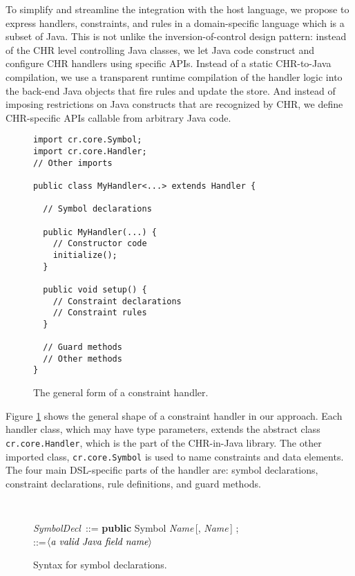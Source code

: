 \documentclass[runningheads,a4paper,11pt,dvipsname]{llncs}
\newcommand\angled[1]{\ensuremath{\left\langle#1\right\rangle}}
\newcommand\nonterm[1]{{\small\it#1\,}}
\begin{document}
To simplify and streamline the integration with the host language, we
propose to express handlers, constraints, and rules in a
domain-specific language which is a subset of Java.  This is not
unlike the inversion-of-control design pattern: instead of the CHR
level controlling Java classes, we let Java code construct and
configure CHR handlers using specific APIs.  Instead of a static
CHR-to-Java compilation, we use a transparent runtime compilation of
the handler logic into the back-end Java objects that fire rules and
update the store.  And instead of imposing restrictions on Java
constructs that are recognized by CHR, we define CHR-specific APIs
callable from arbitrary Java code.

\begin{figure}[tb]
\centering
\begin{minipage}[t]{0.6\textwidth}
\begin{lstlisting}
import cr.core.Symbol;
import cr.core.Handler;
// Other imports

public class MyHandler<...> extends Handler {

  // Symbol declarations

  public MyHandler(...) {
    // Constructor code
    initialize();
  }

  public void setup() {
    // Constraint declarations
    // Constraint rules
  }

  // Guard methods
  // Other methods
}
\end{lstlisting}
\end{minipage}
\caption{The general form of a constraint handler.}
\label{fig:template}
\end{figure}

Figure \ref{fig:template} shows the general shape of a constraint
handler in our approach.  Each handler class, which may have type
parameters, extends the abstract class \texttt{cr.core.Handler}, which
is the part of the CHR-in-Java library.  The other imported class,
\texttt{cr.core.Symbol} is used to name constraints and data
elements.  The four main DSL-specific parts of the handler are: symbol
declarations, constraint declarations, rule definitions, and guard methods.

\begin{figure}[tb]
  \centering
  \begin{minipage}[t]{0.75\textwidth}
    \tt\footnotesize
    \begin{tabbing}
      \nonterm{SymbolDecl} ::= \=\textbf{public} Symbol \nonterm{Name}[,
      \nonterm{Name}] ;\\
      \>\nonterm{Name} ::=\'\angled{\mbox{\it a valid Java field name}}
    \end{tabbing}
  \end{minipage}
  \caption{Syntax for symbol declarations.}
  \label{fig:symdecl}
\end{figure}
\end{document}
